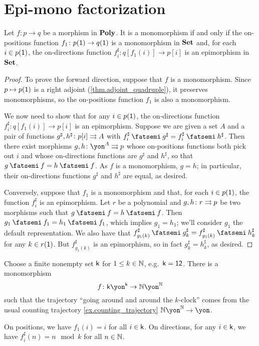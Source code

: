 \documentclass[Book-Poly]{subfiles}
\begin{document}
\section{Epi-mono factorization}

\begin{proposition}\label{prop.monics_in_poly}
Let $f \colon p \to q$ be a morphism in $\mathbf{Poly}$. It is a monomorphism if and only if the on-positions function $f_1 \colon p(\textsf{1}) \to q(\textsf{1})$ is a monomorphism in $\mathbf{Set}$ and, for each $i \in p(\textsf{1})$, the on-directions function $f_i^\sharp \colon q[f_1(i)]\to p[i]$ is an epimorphism in $\mathbf{Set}$.
\end{proposition}
\begin{proof}
To prove the forward direction, suppose that $f$ is a monomorphism.
Since $p\mapsto p(\textsf{1})$ is a right adjoint (\cref{thm.adjoint_quadruple}), it preserves monomorphisms, so the on-positions function $f_1$ is also a monomorphism.

We now need to show that for any $i\in p(\textsf{1})$, the on-directions function $f_i^\sharp \colon q[f_1(i)] \to p[i]$ is an epimorphism.
Suppose we are given a set $A$ and a pair of functions $g^\sharp,h^\sharp\colon p[i]\rightrightarrows A$ with $f^\sharp_i \then g^\sharp = f^\sharp_i \then h^\sharp$.
Then there exist morphisms $g,h \colon \yon^A \tto p$ whose on-positions functions both pick out $i$ and whose on-directions functions are $g^\sharp$ and $h^\sharp$, so that $g \then f = h \then f$.
As $f$ is a monomorphism, $g = h$; in particular, their on-directions functions $g^\sharp$ and $h^\sharp$ are equal, as desired.

Conversely, suppose that $f_1$ is a monomorphism and that, for each $i\in p(\textsf{1})$, the function $f^\sharp_i$ is an epimorphism.
Let $r$ be a polynomial and $g,h\colon r\rightrightarrows p$ be two morphisms such that $g \then f = h \then f$.
Then $g_1 \then f_1 = h_1 \then f_1$, which implies $g_1 = h_1$; we'll consider $g_1$ the default representation.
We also have that $f^\sharp_{g_1(k)} \then g^\sharp_k = f^\sharp_{g_1(k)} \then h^\sharp_k$ for any $k \in r(\textsf{1})$. But $f^\sharp_{g_1(k)}$ is an epimorphism, so in fact $g^\sharp_k = h^\sharp_k$, as desired.
\end{proof}

\begin{example}\label{ex.clock_in_N}
Choose a finite nonempty set $\mathsf{k}$ for $1\leq k\in\mathbb{N}$, e.g.\ $\mathsf{k}=\textsf{1}\textsf{2}$. There is a monomorphism
\[
f \colon\ord{k}\yon^{\ord{k}}\to\nn\yon^\nn
\]
such that the trajectory ``going around and around the $k$-clock'' comes from the usual counting trajectory \cref{ex.counting_trajectory} $\nn\yon^\nn\to\yon$.

On positions, we have $f_1(i)=i$ for all $i \in \mathsf{k}$. On directions, for any $i \in \mathsf{k}$, we have $f^\sharp_i(n) = n \mod k$ for all $n \in \mathbb{N}$.
\end{example}
\end{document}
